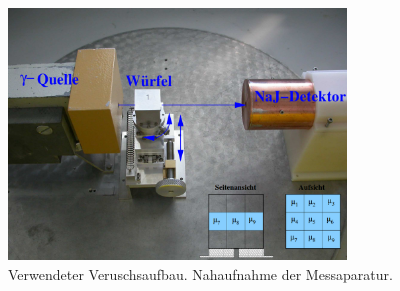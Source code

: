 \begin{figure}[h]
  \centering
  \includegraphics[width=0.8\textwidth]{Pics/Aufbau.png}
  \caption{Verwendeter Veruschsaufbau. Nahaufnahme der Messaparatur.\cite{anleitung}}
  \label{fig:aufbau}
\end{figure}

